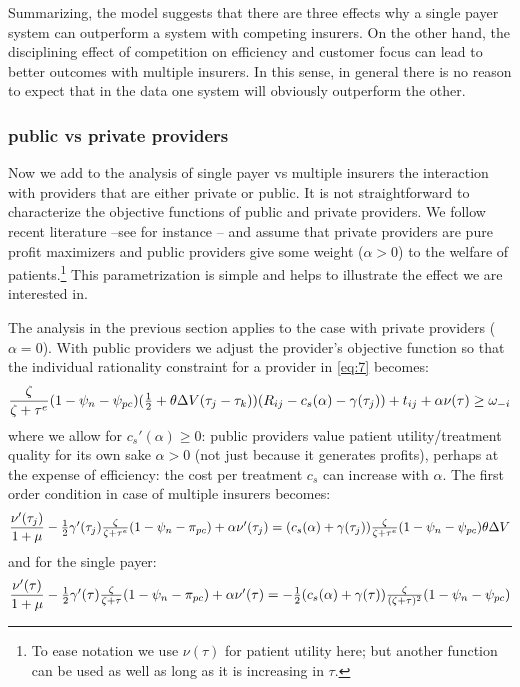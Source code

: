 \documentclass[a4paper,12pt]{article}
\begin{document}
Summarizing, the model suggests that there are three effects why a single payer system can outperform a system with competing insurers. On the other hand, the disciplining effect of competition on efficiency and customer focus can lead to better outcomes with multiple insurers. In this sense, in general there is no reason to expect that in the data one system will obviously outperform the other.

\subsubsection{public vs private providers}
\label{sec:orgc32448d}

Now we add to the analysis of single payer vs multiple insurers the interaction with providers that are either private or public. It is not straightforward to characterize the objective functions of public and private providers. We follow recent literature --see for instance \cite{Brekke2018}-- and assume that private providers are pure profit maximizers and public providers give some weight (\(\alpha > 0\)) to the welfare of patients.\footnote{To ease notation we use \(\nu(\tau)\) for patient utility here; but another function can be used as well as long as it is increasing in \(\tau\).} This parametrization is simple and helps to illustrate the effect we are interested in.

The analysis in the previous section applies to the case with private providers (\(\alpha=0\)). With public providers we adjust the provider's objective function so that the individual rationality constraint for a provider in \eqref{eq:7} becomes:
\begin{equation}
\label{eq:7a}
\frac{\zeta}{\zeta+\tau^e}(1-\psi_n-\psi_{pc})( \textstyle{1\over 2} + \theta \Delta V (\tau_j - \tau_k))(R_{ij}-c_s(\alpha)-\gamma(\tau_j) ) + t_{ij} + \alpha \nu(\tau) \geq \omega_{-i}
\end{equation}
where we allow for \(c_s'(\alpha) \geq 0\): public providers value patient utility/treatment quality for its own sake \(\alpha>0\) (not just because it generates profits), perhaps at the expense of efficiency: the cost per treatment \(c_s\) can increase with \(\alpha\). The first order condition in case of multiple insurers becomes:
\begin{equation}
\label{eq:37public} 
\frac{\nu'(\tau_j)}{1+\mu} - \textstyle{1\over 2} \gamma'(\tau_j) \frac{\zeta}{\zeta+\tau^e}(1-\psi_n-\pi_{pc}) + \alpha \nu'(\tau_j) = (c_s(\alpha)+\gamma(\tau_j)) \frac{\zeta}{\zeta+\tau^e} (1-\psi_n -\psi_{pc})\theta \Delta V 
\end{equation}
and for the single payer:
\begin{equation}
\label{eq:37SPpublic}
 \frac{\nu'(\tau)}{1+\mu} - \textstyle{1\over 2} \gamma'(\tau) \frac{\zeta}{\zeta+\tau}(1-\psi_n-\pi_{pc}) + \alpha \nu'(\tau) = - \textstyle{1\over 2}(c_s(\alpha)+\gamma( \tau)) \frac{\zeta}{(\zeta+\tau)^2} (1-\psi_n -\psi_{pc})
\end{equation}
\end{document}
